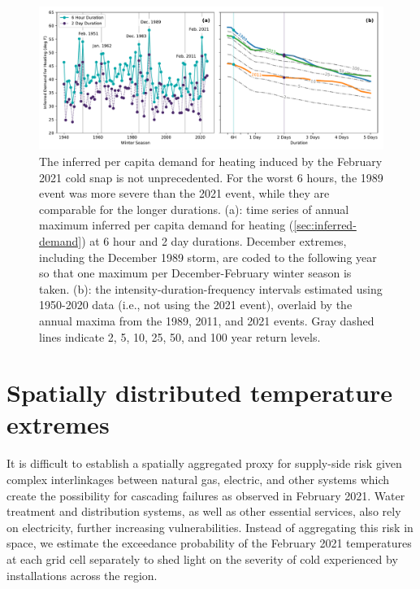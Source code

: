 \documentclass[12pt]{iopart}
\begin{document}
\begin{figure}
  \centering
  \includegraphics[width=\textwidth]{ERCOT_HDD_IDF_MLE_popweighted.pdf}
  \caption{
    The inferred per capita demand for heating induced by the February 2021 cold snap is not unprecedented.
    For the worst 6 hours, the 1989 event was more severe than the 2021 event, while they are comparable for the longer durations.
    (a): time series of annual maximum inferred per capita demand for heating (\cref{sec:inferred-demand}) at 6 hour and 2 day durations.
    December extremes, including the December 1989 storm, are coded to the following year so that one maximum per December-February winter season is taken.
    (b): the intensity-duration-frequency intervals estimated using 1950-2020 data (i.e., not using the 2021 event), overlaid by the annual maxima from the 1989, 2011, and 2021 events.
    Gray dashed lines indicate 2, 5, 10, 25, 50, and 100 year return levels.
  }\label{fig:idf_weighted}
\end{figure}

\section{Spatially distributed temperature extremes}

It is difficult to establish a spatially aggregated proxy for supply-side risk given complex interlinkages between natural gas, electric, and other systems which create the possibility for cascading failures as observed in February 2021.
Water treatment and distribution systems, as well as other essential services, also rely on electricity, further increasing vulnerabilities.
Instead of aggregating this risk in space, we estimate the exceedance probability of the February 2021 temperatures at each grid cell separately to shed light on the severity of cold experienced by installations across the region.
\end{document}
